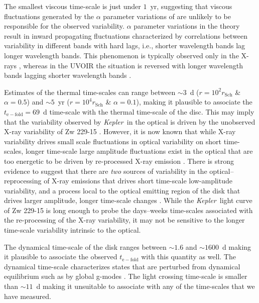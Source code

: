 \documentclass[a4paper,fleqn,usenatbib]{mnras}
\newcommand{\Kepler}{\textit{Kepler~}}
\begin{document}
The smallest viscous time-scale is just under $1$~yr, suggesting that viscous fluctuations generated by the $\alpha$ parameter variations of \citet{Lyubarskii97} are unlikely to be responsible for the observed variability. $\alpha$ parameter variations in the \citet{Lyubarskii97} theory result in inward propagating fluctuations characterized by correlations between variability in different bands with hard lags, i.e., shorter wavelength bands lag longer wavelength bands. This phenomenon is typically observed only in the X-rays \citep{Vaughan04,McHardy04b,Arevalo06}, whereas in the UVOIR the situation is reversed with longer wavelength bands lagging shorter wavelength bands \citep{Wanders97,Sergeev05}.

Estimates of the thermal time-scales can range between $\sim 3$~d ($r = 10^{2} r_{\mathrm{Sch}}$ \& $\alpha = 0.5$) and $\sim 5$~yr ($r = 10^{4} r_{\mathrm{Sch}}$ \& $\alpha = 0.1$), making it plausible to associate the $t_{\mathrm{e-fold}} = 69$~d time-scale with the thermal time-scale of the disc. This may imply that the variability observed by \Kepler in the optical is driven by the unobserved X-ray variability of Zw 229-15 \citep{Krolik91}. However, it is now known that while X-ray variability drives small scale fluctuations in optical variability on short time-scales, longer time-scale large amplitude fluctuations exist in the optical that are too energetic to be driven by re-processed X-ray emission \citep{Uttley03,Arevalo09}. There is strong evidence to suggest that there are \textit{two} sources of variability in the optical--reprocessing of X-ray emissions that drives short time-scale low-amplitude variability, and a process local to the optical emitting region of the disk that drives larger amplitude, longer time-scale changes \citep{Gaskell08}. While the \Kepler light curve of Zw 229-15 is long enough to probe the days--weeks time-scales associated with the re-processing of the X-ray variability, it may not be sensitive to the longer time-scale variability intrinsic to the optical.

The dynamical time-scale of the disk ranges between $\sim 1.6$ and $\sim 1600$~d making it plausible to associate the observed $t_{\mathrm{e-fold}}$ with this quantity as well. The dynamical time-scale characterizes states that are perturbed from dynamical equilibrium such as by global g-modes \citep{ReynoldsMiller09a,ReynoldsMiller09b}. The light crossing time-scale is smaller than $\sim 11$~d making it unsuitable to associate with any of the time-scales that we have measured.
\end{document}
